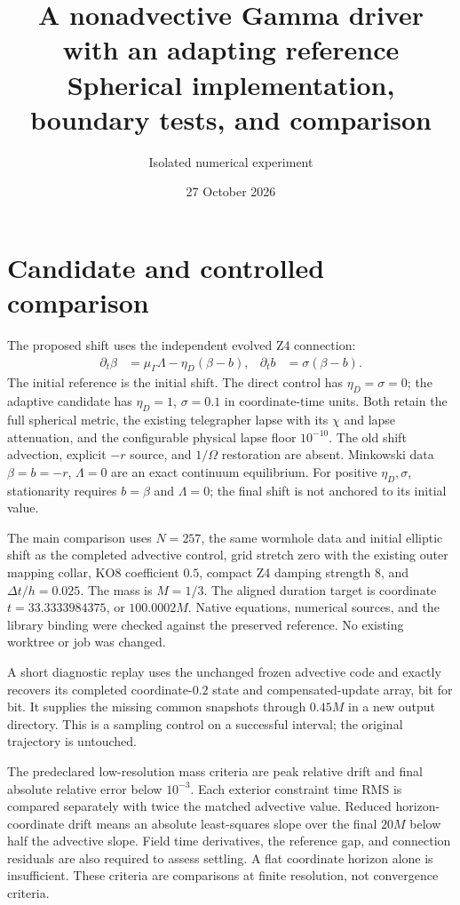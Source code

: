 \documentclass[11pt]{article}
\title{A nonadvective Gamma driver with an adapting reference\\\large Spherical implementation, boundary tests, and comparison}
\author{Isolated numerical experiment}
\date{27 October 2026}
\begin{document}
\maketitle

\section{Candidate and controlled comparison}
The proposed shift uses the independent evolved Z4 connection:
\begin{align}
 \partial_t\beta&=\mu_\Gamma\Lambda-\eta_D(\beta-b),&
 \partial_t b&=\sigma(\beta-b).
\end{align}
The initial reference is the initial shift. The direct control has $\eta_D=\sigma=0$; the adaptive candidate has $\eta_D=1$, $\sigma=0.1$ in coordinate-time units. Both retain the full spherical metric, the existing telegrapher lapse with its $\chi$ and lapse attenuation, and the configurable physical lapse floor $10^{-10}$. The old shift advection, explicit $-r$ source, and $1/\Omega$ restoration are absent. Minkowski data $\beta=b=-r$, $\Lambda=0$ are an exact continuum equilibrium. For positive $\eta_D,\sigma$, stationarity requires $b=\beta$ and $\Lambda=0$; the final shift is not anchored to its initial value.

The main comparison uses $N=257$, the same wormhole data and initial elliptic shift as the completed advective control, grid stretch zero with the existing outer mapping collar, KO8 coefficient $0.5$, compact Z4 damping strength $8$, and $\Delta t/h=0.025$. The mass is $M=1/3$. The aligned duration target is coordinate $t=33.3333984375$, or $100.0002M$. Native equations, numerical sources, and the library binding were checked against the preserved reference. No existing worktree or job was changed.

A short diagnostic replay uses the unchanged frozen advective code and exactly recovers its completed coordinate-$0.2$ state and compensated-update array, bit for bit. It supplies the missing common snapshots through $0.45M$ in a new output directory. This is a sampling control on a successful interval; the original trajectory is untouched.

The predeclared low-resolution mass criteria are peak relative drift and final absolute relative error below $10^{-3}$. Each exterior constraint time RMS is compared separately with twice the matched advective value. Reduced horizon-coordinate drift means an absolute least-squares slope over the final $20M$ below half the advective slope. Field time derivatives, the reference gap, and connection residuals are also required to assess settling. A flat coordinate horizon alone is insufficient. These criteria are comparisons at finite resolution, not convergence criteria.
\end{document}
